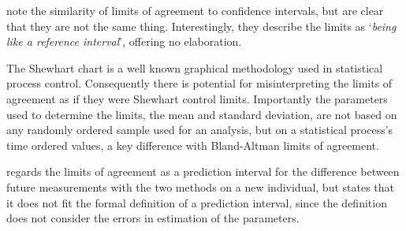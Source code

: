 \documentclass[12pt, a4paper]{report}
\theoremstyle{plain}
\theoremstyle{definition}
\theoremstyle{remark}
\begin{document}
%


\citet{BA99} note the similarity of limits of agreement to
confidence intervals, but are clear that they are not the same thing. Interestingly, they describe the limits as `\textit{being like a reference interval}', offering no elaboration.

The Shewhart chart is a well known graphical
methodology used in statistical process control. Consequently
there is potential for misinterpreting the limits of agreement as
if they were Shewhart control limits. Importantly the
parameters used to determine the limits, the mean and standard
deviation, are not based on any randomly ordered sample used for an analysis, but on a statistical process's time ordered values, a key difference with Bland-Altman limits of agreement.


\citet{BXC2008} regards the limits of agreement as a prediction interval for the difference between future measurements with the two methods on a new individual, but states that it does not fit the formal definition of a prediction interval, since the
definition does not consider the errors in estimation of the parameters. 
\end{document}
